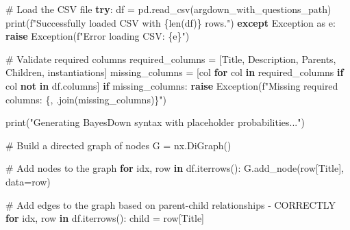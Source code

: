 \documentclass[
  11pt,
  letterpaper,
]{book}
\newenvironment{Shaded}{\begin{snugshade}}{\end{snugshade}}
\newcommand{\BuiltInTok}[1]{\textcolor[rgb]{0.00,0.23,0.31}{#1}}
\newcommand{\CommentTok}[1]{\textcolor[rgb]{0.37,0.37,0.37}{#1}}
\newcommand{\ControlFlowTok}[1]{\textcolor[rgb]{0.00,0.23,0.31}{\textbf{#1}}}
\newcommand{\ImportTok}[1]{\textcolor[rgb]{0.00,0.46,0.62}{#1}}
\newcommand{\KeywordTok}[1]{\textcolor[rgb]{0.00,0.23,0.31}{\textbf{#1}}}
\newcommand{\NormalTok}[1]{\textcolor[rgb]{0.00,0.23,0.31}{#1}}
\newcommand{\OperatorTok}[1]{\textcolor[rgb]{0.37,0.37,0.37}{#1}}
\newcommand{\PreprocessorTok}[1]{\textcolor[rgb]{0.68,0.00,0.00}{#1}}
\newcommand{\SpecialCharTok}[1]{\textcolor[rgb]{0.37,0.37,0.37}{#1}}
\newcommand{\SpecialStringTok}[1]{\textcolor[rgb]{0.13,0.47,0.30}{#1}}
\newcommand{\StringTok}[1]{\textcolor[rgb]{0.13,0.47,0.30}{#1}}
\begin{document}
\begin{Shaded}
\begin{Highlighting}[]
  \CommentTok{\# Load the CSV file}
  \ControlFlowTok{try}\NormalTok{:}
\NormalTok{      df }\OperatorTok{=}\NormalTok{ pd.read\_csv(argdown\_with\_questions\_path)}
      \BuiltInTok{print}\NormalTok{(}\SpecialStringTok{f"Successfully loaded CSV with }\SpecialCharTok{\{}\BuiltInTok{len}\NormalTok{(df)}\SpecialCharTok{\}}\SpecialStringTok{ rows."}\NormalTok{)}
  \ControlFlowTok{except} \PreprocessorTok{Exception} \ImportTok{as}\NormalTok{ e:}
      \ControlFlowTok{raise} \PreprocessorTok{Exception}\NormalTok{(}\SpecialStringTok{f"Error loading CSV: }\SpecialCharTok{\{}\NormalTok{e}\SpecialCharTok{\}}\SpecialStringTok{"}\NormalTok{)}

  \CommentTok{\# Validate required columns}
\NormalTok{  required\_columns }\OperatorTok{=}\NormalTok{ [}\StringTok{\textquotesingle{}Title\textquotesingle{}}\NormalTok{, }\StringTok{\textquotesingle{}Description\textquotesingle{}}\NormalTok{, }\StringTok{\textquotesingle{}Parents\textquotesingle{}}\NormalTok{, }\StringTok{\textquotesingle{}Children\textquotesingle{}}\NormalTok{, }\StringTok{\textquotesingle{}instantiations\textquotesingle{}}\NormalTok{]}
\NormalTok{  missing\_columns }\OperatorTok{=}\NormalTok{ [col }\ControlFlowTok{for}\NormalTok{ col }\KeywordTok{in}\NormalTok{ required\_columns }\ControlFlowTok{if}\NormalTok{ col }\KeywordTok{not} \KeywordTok{in}\NormalTok{ df.columns]}
  \ControlFlowTok{if}\NormalTok{ missing\_columns:}
      \ControlFlowTok{raise} \PreprocessorTok{Exception}\NormalTok{(}\SpecialStringTok{f"Missing required columns: }\SpecialCharTok{\{}\StringTok{\textquotesingle{}, \textquotesingle{}}\SpecialCharTok{.}\NormalTok{join(missing\_columns)}\SpecialCharTok{\}}\SpecialStringTok{"}\NormalTok{)}

  \BuiltInTok{print}\NormalTok{(}\StringTok{"Generating BayesDown syntax with placeholder probabilities..."}\NormalTok{)}

  \CommentTok{\# Build a directed graph of nodes}
\NormalTok{  G }\OperatorTok{=}\NormalTok{ nx.DiGraph()}

  \CommentTok{\# Add nodes to the graph}
  \ControlFlowTok{for}\NormalTok{ idx, row }\KeywordTok{in}\NormalTok{ df.iterrows():}
\NormalTok{      G.add\_node(row[}\StringTok{\textquotesingle{}Title\textquotesingle{}}\NormalTok{], data}\OperatorTok{=}\NormalTok{row)}

  \CommentTok{\# Add edges to the graph based on parent{-}child relationships {-} CORRECTLY}
  \ControlFlowTok{for}\NormalTok{ idx, row }\KeywordTok{in}\NormalTok{ df.iterrows():}
\NormalTok{      child }\OperatorTok{=}\NormalTok{ row[}\StringTok{\textquotesingle{}Title\textquotesingle{}}\NormalTok{]}


\end{Highlighting}
\end{Shaded}
\end{document}
